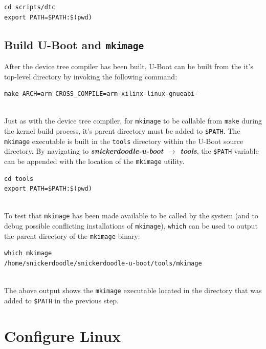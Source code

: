 \begin{lstlisting}[style=text]
cd scripts/dtc
export PATH=$PATH:$(pwd)
\end{lstlisting}

\subsection{Build U-Boot and \texttt{mkimage}}

After the device tree compiler has been built, U-Boot can be built from the it's top-level directory by invoking the following command: \\

\begin{lstlisting}[style=text]
make ARCH=arm CROSS_COMPILE=arm-xilinx-linux-gnueabi- 
\end{lstlisting}

~\\
\noindent
Just as with the device tree compiler, for \texttt{mkimage} to be callable from \texttt{make} during the kernel build process, it's parent directory must be added to \texttt{\$PATH}. The \texttt{mkimage} executable is built in the \texttt{tools} directory within the U-Boot source directory. By navigating to \textit{\bfseries snickerdoodle-u-boot $\rightarrow$ tools}, the \texttt{\$PATH} variable can be appended with the location of the \texttt{mkimage} utility. \\

\begin{lstlisting}
cd tools
export PATH=$PATH:$(pwd)
\end{lstlisting}

~\\
\noindent
To test that \texttt{mkimage} has been made available to be called by the system (and to debug possible conflicting installations of \texttt{mkimage}), \texttt{which} can be used to output the parent directory of the \texttt{mkimage} binary: \\

\begin{lstlisting}[style=text] which mkimage
/home/snickerdoodle/snickerdoodle-u-boot/tools/mkimage
\end{lstlisting}

~\\
\noindent
The above output shows the \texttt{mkimage} executable located in the directory that was added to \texttt{\$PATH} in the previous step.


\section{Configure Linux}

